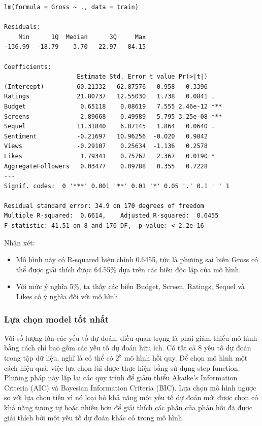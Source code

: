 \begin{lstlisting}
lm(formula = Gross ~ ., data = train)

Residuals:
    Min      1Q  Median      3Q     Max 
-136.99  -18.79    3.70   22.97   84.15 

Coefficients:
                    Estimate Std. Error t value Pr(>|t|)    
(Intercept)        -60.21332   62.87576  -0.958   0.3396    
Ratings             21.80737   12.55030   1.738   0.0841 .  
Budget               0.65118    0.08619   7.555 2.46e-12 ***
Screens              2.89668    0.49989   5.795 3.25e-08 ***
Sequel              11.31840    6.07145   1.864   0.0640 .  
Sentiment           -0.21697   10.96256  -0.020   0.9842    
Views               -0.29107    0.25634  -1.136   0.2578    
Likes                1.79341    0.75762   2.367   0.0190 *  
AggregateFollowers   0.03477    0.09788   0.355   0.7228    
---
Signif. codes:  0 '***' 0.001 '**' 0.01 '*' 0.05 '.' 0.1 ' ' 1

Residual standard error: 34.9 on 170 degrees of freedom
Multiple R-squared:  0.6614,	Adjusted R-squared:  0.6455 
F-statistic: 41.51 on 8 and 170 DF,  p-value: < 2.2e-16
\end{lstlisting}
Nhận xét:
\begin{itemize}
    \item Mô hình này có R-squared hiệu chỉnh 0.6455, tức là phương sai biến Gross có thể được giải thích được 64.55\% dựa trên các biến độc lập của mô hình.
    \item Với mức ý nghĩa 5\%, ta thấy các biến Budget, Screen, Ratings, Sequel và Likes có ý nghĩa đối với mô hình
\end{itemize}

\subsubsection{Lựa chọn model tốt nhất}

Với số lượng lớn các yếu tố dự đoán, điều quan trọng là phải giảm thiểu mô hình bằng cách chỉ bao gồm các yếu tố dự đoán hữu ích. Có tất cả 8 yếu tố dự đoán trong tập dữ liệu, nghĩ là có thể có $2^{8}$ mô hình hồi quy. Để chọn mô hình một cách hiệu quả, việc lựa chọn lùi được thực hiện bằng sử dụng step function. Phương pháp này lặp lại các quy trình để giảm thiểu Akaike’s Information Criteria (AIC) và Bayesian Information Criteria (BIC). Lựa chọn mô hình ngược so với lựa chọn tiến vì nó loại bỏ khả năng một yếu tố dự đoán mới được chọn có khả năng tương tự hoặc nhiều hơn để giải thích các phần của phản hồi đã được giải thích bởi một yếu tố dự đoán khác có trong mô hình.

